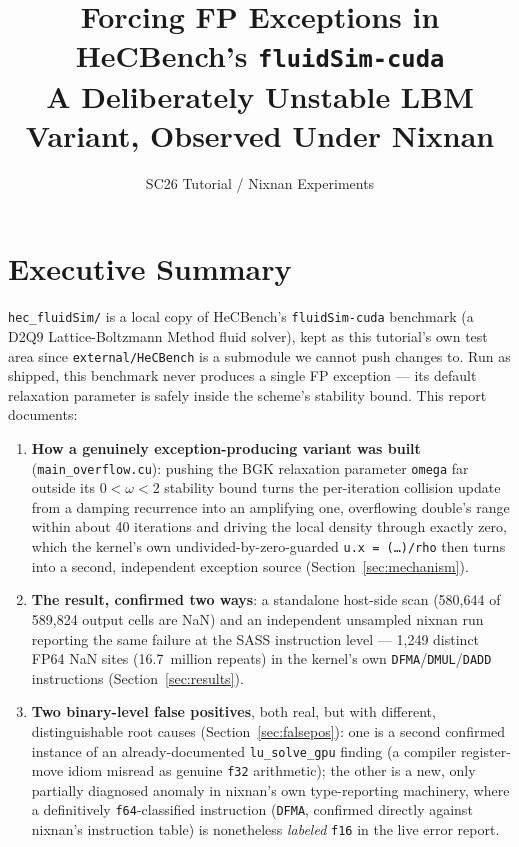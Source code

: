 \documentclass[11pt,a4paper]{article}
\title{Forcing FP Exceptions in HeCBench's \texttt{fluidSim-cuda}\\
\large A Deliberately Unstable LBM Variant, Observed Under Nixnan}
\author{SC26 Tutorial / Nixnan Experiments}
\date{}
\begin{document}
\maketitle

\section{Executive Summary}

\texttt{hec\_fluidSim/} is a local copy of HeCBench's \texttt{fluidSim-cuda}
benchmark (a D2Q9 Lattice-Boltzmann Method fluid solver), kept as this
tutorial's own test area since \texttt{external/HeCBench} is a submodule we
cannot push changes to. Run as shipped, this benchmark never produces a
single FP exception --- its default relaxation parameter is safely inside
the scheme's stability bound. This report documents:

\begin{enumerate}
  \item \textbf{How a genuinely exception-producing variant was built}
    (\texttt{main\_overflow.cu}): pushing the BGK relaxation parameter
    \texttt{omega} far outside its $0 < \omega < 2$ stability bound turns
    the per-iteration collision update from a damping recurrence into an
    amplifying one, overflowing double's range within about 40 iterations
    and driving the local density through exactly zero, which the
    kernel's own undivided-by-zero-guarded \texttt{u.x = (\ldots)/rho}
    then turns into a second, independent exception source
    (Section~\ref{sec:mechanism}).
  \item \textbf{The result, confirmed two ways}: a standalone host-side
    scan (580,644 of 589,824 output cells are NaN) and an independent
    unsampled nixnan run reporting the same failure at the SASS
    instruction level --- 1,249 distinct FP64 NaN sites (16.7~million
    repeats) in the kernel's own \texttt{DFMA}/\texttt{DMUL}/\texttt{DADD}
    instructions (Section~\ref{sec:results}).
  \item \textbf{Two binary-level false positives}, both real, but with
    different, distinguishable root causes (Section~\ref{sec:falsepos}):
    one is a second confirmed instance of an already-documented
    \texttt{lu\_solve\_gpu} finding (a compiler register-move idiom
    misread as genuine \texttt{f32} arithmetic); the other is a new,
    only partially diagnosed anomaly in nixnan's own type-reporting
    machinery, where a definitively \texttt{f64}-classified instruction
    (\texttt{DFMA}, confirmed directly against nixnan's instruction
    table) is nonetheless \emph{labeled} \texttt{f16} in the live error
    report.
\end{enumerate}
\end{document}
